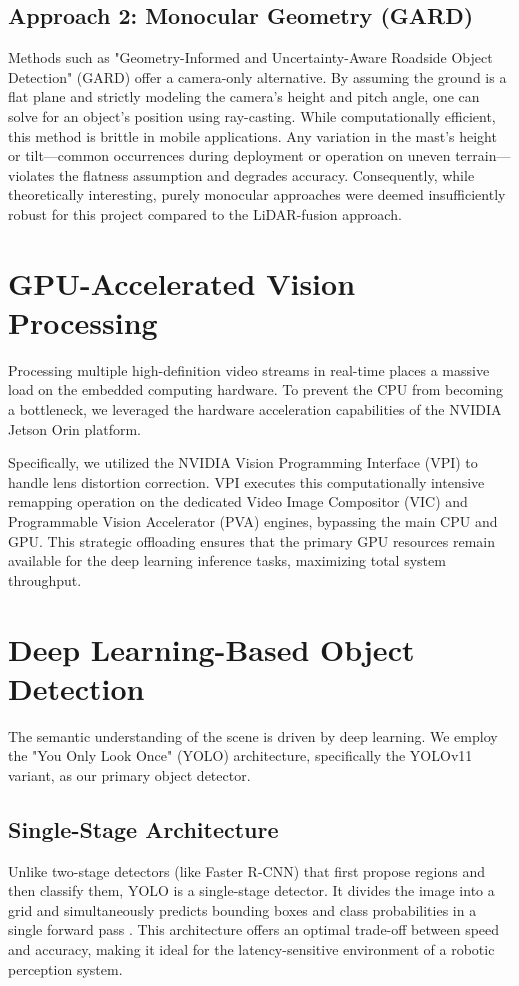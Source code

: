 \documentclass[12pt,a4paper]{report}
\begin{document}
\subsection{Approach 2: Monocular Geometry (GARD)}
Methods such as "Geometry-Informed and Uncertainty-Aware Roadside Object Detection" (GARD) \cite{GARD} offer a camera-only alternative. By assuming the ground is a flat plane and strictly modeling the camera's height and pitch angle, one can solve for an object's position using ray-casting.
While computationally efficient, this method is brittle in mobile applications. Any variation in the mast's height or tilt—common occurrences during deployment or operation on uneven terrain—violates the flatness assumption and degrades accuracy. Consequently, while theoretically interesting, purely monocular approaches were deemed insufficiently robust for this project compared to the LiDAR-fusion approach.

\section{GPU-Accelerated Vision Processing}
Processing multiple high-definition video streams in real-time places a massive load on the embedded computing hardware. To prevent the CPU from becoming a bottleneck, we leveraged the hardware acceleration capabilities of the NVIDIA Jetson Orin platform.

Specifically, we utilized the NVIDIA Vision Programming Interface (VPI) to handle lens distortion correction. VPI executes this computationally intensive remapping operation on the dedicated Video Image Compositor (VIC) and Programmable Vision Accelerator (PVA) engines, bypassing the main CPU and GPU. This strategic offloading ensures that the primary GPU resources remain available for the deep learning inference tasks, maximizing total system throughput.

\section{Deep Learning-Based Object Detection}
The semantic understanding of the scene is driven by deep learning. We employ the "You Only Look Once" (YOLO) architecture, specifically the YOLOv11 variant, as our primary object detector.

\subsection{Single-Stage Architecture}
Unlike two-stage detectors (like Faster R-CNN) that first propose regions and then classify them, YOLO is a single-stage detector. It divides the image into a grid and simultaneously predicts bounding boxes and class probabilities in a single forward pass \cite{redmon2016yolo}. This architecture offers an optimal trade-off between speed and accuracy, making it ideal for the latency-sensitive environment of a robotic perception system.
\end{document}
